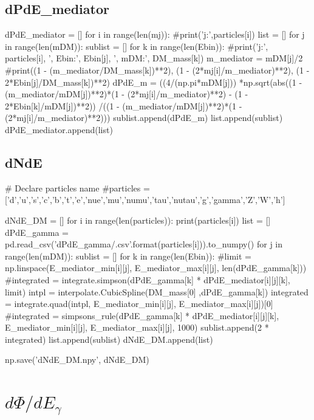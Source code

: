 \documentclass[10pt, oneside]{book}
\numberwithin{equation}{chapter}
\begin{document}
\subsection{dPdE\_mediator}
\begin{python}
dPdE_mediator = []
for i in range(len(mj)):
    #print('j:',particles[i])
    list = []
    for j in range(len(mDM)):
        sublist = []
        for k in range(len(Ebin)):
            #print('j:', particles[i], ', Ebin:', Ebin[j], ', mDM:', DM_mass[k])
            m_mediator = mDM[j]/2
            #print((1 - (m_mediator/DM_mass[k])**2), (1 - (2*mj[i]/m_mediator)**2), (1 - 2*Ebin[j]/DM_mass[k])**2)
            dPdE_m = ((4/(np.pi*mDM[j]))
                     *np.sqrt(abs((1 - (m_mediator/mDM[j])**2)*(1 - (2*mj[i]/m_mediator)**2) - (1 - 2*Ebin[k]/mDM[j])**2))
                     /((1 - (m_mediator/mDM[j])**2)*(1 - (2*mj[i]/m_mediator)**2)))
            sublist.append(dPdE_m)
        list.append(sublist)
    dPdE_mediator.append(list)
\end{python}

\subsection{dNdE}
\begin{python}
# Declare particles name
#particles = ['d','u','s','c','b','t','e','nue','mu','numu','tau','nutau','g','gamma','Z','W','h']

dNdE_DM = []
for i in range(len(particles)):
    print(particles[i])
    list = []
    dPdE_gamma = pd.read_csv('dPdE_gamma/{}.csv'.format(particles[i])).to_numpy()
    for j in range(len(mDM)):
        sublist = []
        for k in range(len(Ebin)):
            #limit = np.linspace(E_mediator_min[i][j], E_mediator_max[i][j], len(dPdE_gamma[k]))
            #integrated = integrate.simpson(dPdE_gamma[k] * dPdE_mediator[i][j][k], limit)
            intpl = interpolate.CubicSpline(DM_mass[0] ,dPdE_gamma[k])
            integrated = integrate.quad(intpl, E_mediator_min[i][j], E_mediator_max[i][j])[0]
            #integrated = simpsons_rule(dPdE_gamma[k] * dPdE_mediator[i][j][k], E_mediator_min[i][j], E_mediator_max[i][j], 1000)
            sublist.append(2 * integrated)
        list.append(sublist)
    dNdE_DM.append(list)

    np.save('dNdE_DM.npy', dNdE_DM)
\end{python}

\section{$d\Phi/dE_\gamma$}
\end{document}

